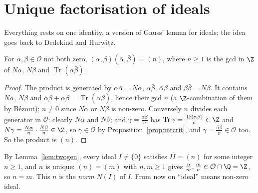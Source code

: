 
\section{Unique factorisation of ideals}

Everything rests on one identity, a version of Gauss' lemma for ideals; the idea goes back to Dedekind and Hurwitz.

\begin{lemma}\label{lem:hurwitz}
For $\alpha,\beta\in\mathcal O$ not both zero, $(\alpha,\beta)(\bar\alpha,\bar\beta)=(n)$, where $n\ge1$ is the gcd in $\Z$ of $N\alpha$, $N\beta$ and $\operatorname{Tr}(\alpha\bar\beta)$.
\end{lemma}
\begin{proof}
The product is generated by $\alpha\bar\alpha=N\alpha$, $\alpha\bar\beta$, $\bar\alpha\beta$ and $\beta\bar\beta=N\beta$. It contains $N\alpha$, $N\beta$ and $\alpha\bar\beta+\bar\alpha\beta=\operatorname{Tr}(\alpha\bar\beta)$, hence their gcd $n$ (a $\Z$-combination of them by B\'ezout); $n\ne0$ since $N\alpha$ or $N\beta$ is non-zero. Conversely $n$ divides each generator in $\mathcal O$: clearly $N\alpha$ and $N\beta$; and $\gamma=\frac{\alpha\bar\beta}n$ has $\operatorname{Tr}\gamma=\frac{\operatorname{Tr}(\alpha\bar\beta)}n\in\Z$ and $N\gamma=\frac{N\alpha}n\cdot\frac{N\beta}n\in\Z$, so $\gamma\in\mathcal O$ by Proposition~\ref{prop:intcrit}, and $\bar\gamma=\frac{\bar\alpha\beta}n\in\mathcal O$ too. So the product is $(n)$.
\end{proof}

By Lemma~\ref{lem:twogen}, every ideal $I\ne\{0\}$ satisfies $I\bar I=(n)$ for some integer $n\ge1$, and $n$ is unique: $(n)=(m)$ with $n,m\ge1$ gives $\frac nm,\frac mn\in\mathcal O\cap\Q=\Z$, so $n=m$. This $n$ is the \emph{norm} $N(I)$ of $I$. From now on ``ideal'' means non-zero ideal.

